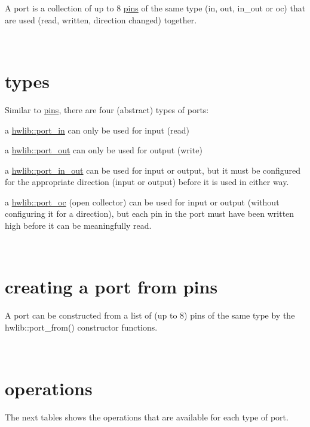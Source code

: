 A port is a collection of up to 8 \hyperlink{pins}{pins} of the same type (in, out, in\+\_\+out or oc) that are used (read, written, direction changed) together.

~\newline
 

\hypertarget{ports_port-types}{}\section{types}\label{ports_port-types}
Similar to \hyperlink{pins}{pins}, there are four (abstract) types of ports\+:


\begin{DoxyItemize}
\item a \hyperlink{classhwlib_1_1port__in}{hwlib\+::port\+\_\+in} can only be used for input (read)
\item a \hyperlink{classhwlib_1_1port__out}{hwlib\+::port\+\_\+out} can only be used for output (write)
\item a \hyperlink{classhwlib_1_1port__in__out}{hwlib\+::port\+\_\+in\+\_\+out} can be used for input or output, but it must be configured for the appropriate direction (input or output) before it is used in either way.
\item a \hyperlink{classhwlib_1_1port__oc}{hwlib\+::port\+\_\+oc} (open collector) can be used for input or output (without configuring it for a direction), but each pin in the port must have been written high before it can be meaningfully read.
\end{DoxyItemize}

~\newline
 

\hypertarget{ports_port-from}{}\section{creating a port from pins}\label{ports_port-from}
A port can be constructed from a list of (up to 8) pins of the same type by the hwlib\+::port\+\_\+from() constructor functions.


\begin{DoxyCodeInclude}
\end{DoxyCodeInclude}
 ~\newline
 

\hypertarget{ports_port-operation}{}\section{operations}\label{ports_port-operation}
The next tables shows the operations that are available for each type of port.

